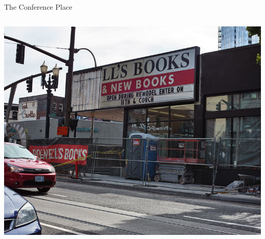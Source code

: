 \documentclass[17pt,dvipdfmx]{beamer}
\begin{document}
\begin{frame}[t]{The Conference Place}
\begin{columns}[t]
\begin{column}{.4\textwidth}
      \includegraphics[width=.9\textwidth]{powells.jpg}
    \end{column}
  \end{columns}
\end{frame}
\end{document}
